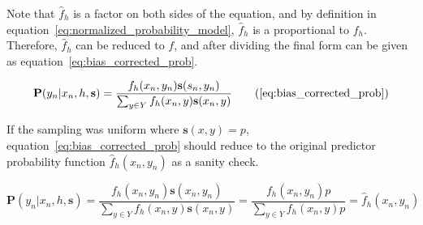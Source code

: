 \documentclass[twoside]{article}
\begin{document}
\begin{appendices}
Note that \(\hat{f}_h\) is a factor on both sides of the equation, and by definition  in equation~\eqref{eq:normalized_probability_model}, \(\hat{f}_h\) is a proportional to \(f_h\). Therefore, \(\hat{f}_h\) can be reduced to \(f\), and after dividing the final form can be given as equation~\eqref{eq:bias_corrected_prob}.

\begin{equation}
\mathbf{P}(y_n|x_n,h,\mathbf{s})=\dfrac{f_h(x_n,y_n)\mathbf{s}(s_n,y_n)}{\sum_{y \in Y}f_h(x_n,y)\mathbf{s}(x_n,y)}
\tag{\ref{eq:bias_corrected_prob}}
\end{equation}

If the sampling was uniform where \(\mathbf{s}(x,y)=p\), equation~\eqref{eq:bias_corrected_prob} should reduce to the original predictor probability function \(\hat{f}_h(x_n,y_n)\) as a sanity check.

\[\mathbf{P}(y_n|x_n,h,\mathbf{s})=\frac{f_h(x_n,y_n)\mathbf{s}(x_n,y_n)}{\sum_{y \in Y}f_h(x_n,y)\mathbf{s}(x_n,y)}=\frac{f_h(x_n,y_n)p}{\sum_{y \in Y}f_h(x_n,y)p} =\hat{f}_h(x_n,y_n)\]

\end{appendices}

\end{document}
